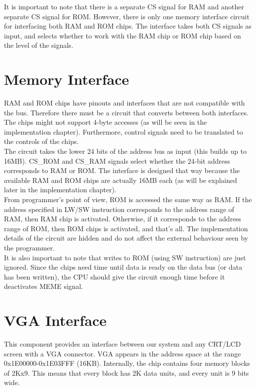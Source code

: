 \documentclass[oneside]{book}
\begin{document}
It is important to note that there is a separate CS signal for RAM and 
another separate CS signal for ROM. However, there is only one memory
interface circuit for interfacing both RAM and ROM chips. The interface
takes both CS signals as input, and selects whether to work with the
RAM chip or ROM chip based on the level of the signals.

\section{Memory Interface}

RAM and ROM chips have pinouts and interfaces that are not compatible
with the bus. Therefore there must be a circuit that converts between
both interfaces. The chips might not support 4-byte accesses (as will
be seen in the implementation chapter). Furthermore, control signals
need to be translated to the controls of the chips.\\

The circuit takes the lower 24 bits of the address bus as input (this
builds up to 16MB). CS\_ROM and CS\_RAM signals select whether the
24-bit address corresponds to RAM or ROM. The interface is designed that
way because the available RAM and ROM chips are actually 16MB each (as
will be explained later in the implementation chapter).\\

From programmer's point of view, ROM is accessed the same way as RAM.
If the address specified in LW/SW instruction corresponds to the
address range of RAM, then RAM chip is activated. Otherwise, if it
corresponds to the address range of ROM, then ROM chips is activated, 
and that's all. The implementation details of the circuit are hidden
and do not affect the external behaviour seen by the programmer.\\

It is also important to note that writes to ROM (using SW instruction) are
just ignored. Since the chips need time until data is ready on
the data bus (or data has been written), the CPU should give the
circuit enough time before it deactivates MEME signal.

\section{VGA Interface}

This component provides an interface between our system and any CRT/LCD
screen with a VGA connector. VGA appears in the address space at the
range 0x1E00000-0x1E03FFF (16KB). Internally, the chip contains four
memory blocks of 2Kx9. This means that every block has 2K data units,
and every unit is 9 bits wide.\\ 
\end{document}

